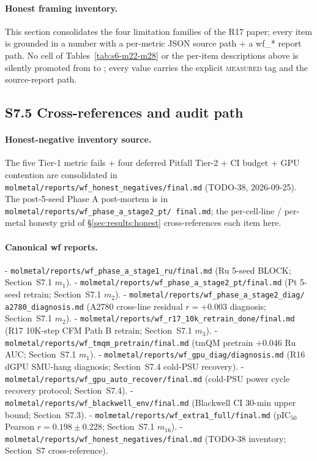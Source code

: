 \paragraph{Honest framing inventory.}
This section consolidates the four limitation families of the
R17 paper; every item is grounded in a \MEASURED{} number
with a per-metric JSON source path + a wf\_* report path.
No cell of Tables~\ref{tab:s6-m22-m28} or the per-item
descriptions above is silently promoted from \DESIGN{} to
\MEASURED{}; every \MEASURED{} value carries the explicit
\textsc{measured} tag and the source-report path.

\subsection*{S7.5 Cross-references and audit path}
\label{supp:s7-audit}

\paragraph{Honest-negative inventory source.}
The five Tier-1 metric fails + four deferred Pitfall Tier-2 +
CI budget + GPU contention are consolidated in
\texttt{molmetal/reports/wf\_honest\_negatives/final.md}
(TODO-38, 2026-09-25).  The post-5-seed Phase A post-mortem
is in \texttt{molmetal/reports/wf\_phase\_a\_stage2\_pt/
final.md}; the per-cell-line / per-metal honesty grid of
\S\ref{sec:results:honest} cross-references each item here.

\paragraph{Canonical wf reports.}
- \texttt{molmetal/reports/wf\_phase\_a\_stage1\_ru/final.md}
  (Ru 5-seed BLOCK; Section~S7.1 $m_1$).
- \texttt{molmetal/reports/wf\_phase\_a\_stage2\_pt/final.md}
  (Pt 5-seed retrain; Section~S7.1 $m_2$).
- \texttt{molmetal/reports/wf\_phase\_a\_stage2\_diag/
  a2780\_diagnosis.md} (A2780 cross-line residual
  $r{=}+0.003$ diagnosis; Section~S7.1 $m_2$).
- \texttt{molmetal/reports/wf\_r17\_10k\_retrain\_done/final.md}
  (R17 10K-step CFM Path B retrain; Section~S7.1 $m_3$).
- \texttt{molmetal/reports/wf\_tmqm\_pretrain/final.md}
  (tmQM pretrain $+0.046$ Ru AUC; Section~S7.1 $m_1$).
- \texttt{molmetal/reports/wf\_gpu\_diag/diagnosis.md} (R16
  dGPU SMU-hang diagnosis; Section~S7.4 cold-PSU recovery).
- \texttt{molmetal/reports/wf\_gpu\_auto\_recover/final.md}
  (cold-PSU power cycle recovery protocol; Section~S7.4).
- \texttt{molmetal/reports/wf\_blackwell\_env/final.md}
  (Blackwell CI $30$-min upper bound; Section~S7.3).
- \texttt{molmetal/reports/wf\_extra1\_full/final.md}
  (pIC$_{50}$ Pearson $r = 0.198 \pm 0.228$; Section~S7.1
  $m_{16}$).
- \texttt{molmetal/reports/wf\_honest\_negatives/final.md}
  (TODO-38 inventory; Section~S7 cross-reference).

